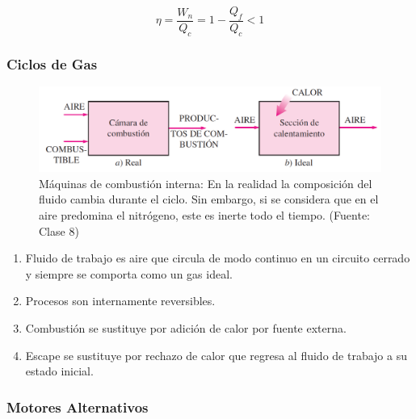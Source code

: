     \[\eta = \frac{W_{n}}{Q_{c}} = 1 - \frac{Q_{f}}{Q_{c}} < 1\]
        
        \subsubsection{Ciclos de Gas}
        
        \begin{quote}
            \textit{}
        \end{quote}
        
            
            \begin{figure}[H]
                \caption[Máquinas de combustión interna]{Máquinas de combustión interna: En la realidad la composición del fluido cambia durante el ciclo. Sin embargo, si se considera que en el aire predomina el nitrógeno, este es inerte todo el tiempo. (Fuente: Clase 8)}
                \label{fig:comb_interna}
                \includegraphics[width=.7\textwidth]{img/clases/combustion_interna.png}
            \end{figure}
            
            
            \begin{enumerate}
                \item Fluido de trabajo es aire que circula de modo continuo en un circuito cerrado y siempre se comporta como un gas ideal.
                \item Procesos son internamente reversibles.
                \item Combustión se sustituye por adición de calor por fuente externa.
                \item Escape se sustituye por rechazo de calor que regresa al fluido de trabajo a su estado inicial.
            \end{enumerate}
            
        \subsubsection{Motores Alternativos}
            

